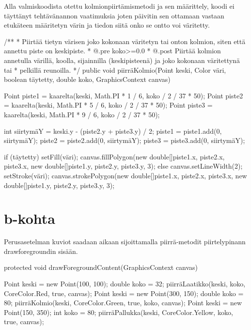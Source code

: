 Alla valmiskoodista otettu kolmionpiirtämismetodi ja sen määrittely, koodi ei
täyttänyt tehtävänannon vaatimuksia joten päivitin sen ottamaan vastaan etukäteen
määritetyn värin ja tiedon siitä onko se ontto voi väritetty.
\begin{javacode}
/**
* Piirtää tietyn värisen joko kokonaan väritetyn tai onton kolmion, siten että annettu
piste on keskipiste.
* @.pre koko>=0.0
* @.post Piirtää kolmion annetulla värillä, koolla, sijainnilla (keskipisteenä) ja
  joko kokonaan väritettynä tai
* pelkillä reunoilla.
*/
    public void piirräKolmio(Point keski, Color väri, boolean täytetty, double koko,
    GraphicsContext canvas) {
        Point piste1 = kaarelta(keski, Math.PI * 1 / 6, koko / 2 / 37 * 50);
        Point piste2 = kaarelta(keski, Math.PI * 5 / 6, koko / 2 / 37 * 50);
        Point piste3 = kaarelta(keski, Math.PI * 9 / 6, koko / 2 / 37 * 50);

        int siirtymäY = keski.y - (piste2.y + piste3.y) / 2;
        piste1 = piste1.add(0, siirtymäY);
        piste2 = piste2.add(0, siirtymäY);
        piste3 = piste3.add(0, siirtymäY);
    
    if (täytetty){
      setFill(väri);
      canvas.fillPolygon(new double[]{piste1.x, piste2.x, piste3.x}, new
      double[]{piste1.y, piste2.y, piste3.y}, 3);
    } else{
      canvas.setLineWidth(2);
            setStroke(väri);
            canvas.strokePolygon(new double[]{piste1.x, piste2.x, piste3.x},
            new double[]{piste1.y, piste2.y, piste3.y}, 3);
    }
        
    }
\end{javacode}


\section{b-kohta}
\label{b-kohta}
Perusasetelman kuviot saadaan aikaan sijoittamalla piirrä-metodit piirtelypinann
drawforegroundin sisään.
\begin{javacode}
    protected void drawForegroundContent(GraphicsContext canvas) {

        {
            Point keski = new Point(100, 100);
            double koko = 32;
            piirräLaatikko(keski, koko, CoreColor.Red, true, canvas);
        }
        {
            Point keski = new Point(300, 150);
            double koko = 80;
            piirräKolmio(keski, CoreColor.Green, true, koko, canvas);
        }
        {
            Point keski = new Point(150, 350);
            int koko = 80; 
            piirräPallukka(keski, CoreColor.Yellow, koko, true, canvas);
        }
    }
\end{javacode}

